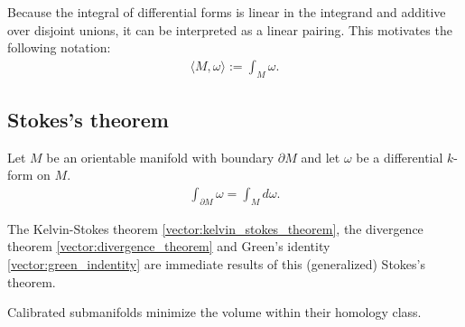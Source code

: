 
    \begin{notation}
        Because the integral of differential forms is linear in the integrand and additive over disjoint unions, it can be interpreted as a linear pairing. This motivates the following notation:
        \begin{gather}
            \langle M,\omega \rangle := \int_M\omega.
        \end{gather}
    \end{notation}

\subsection{Stokes's theorem}

    \begin{theorem}\label{bundle:stokes_theorem}
        Let $M$ be an orientable manifold with boundary $\partial M$ and let $\omega$ be a differential $k$-form on $M$.
        \begin{gather}
            \int_{\partial M}\omega = \int_M d\omega.
        \end{gather}
    \end{theorem}
    \begin{result}
        The Kelvin-Stokes theorem \ref{vector:kelvin_stokes_theorem}, the divergence theorem \ref{vector:divergence_theorem} and Green's identity \ref{vector:green_indentity} are immediate results of this (generalized) Stokes's theorem.
    \end{result}

    \begin{property}
        Calibrated submanifolds minimize the volume within their homology class.
    \end{property}

